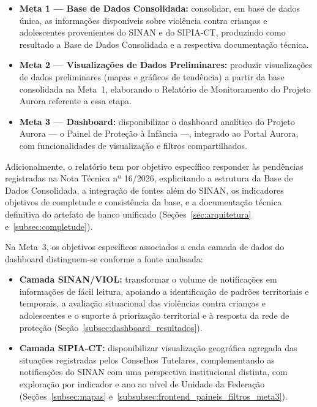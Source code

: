 \documentclass[11pt,a4paper]{article}
\begin{document}
\begin{itemize}
  \item \textbf{Meta 1 — Base de Dados Consolidada:} consolidar, em base de dados única, as informações disponíveis sobre violência contra crianças e adolescentes provenientes do SINAN e do SIPIA-CT, produzindo como resultado a Base de Dados Consolidada e a respectiva documentação técnica.
  \item \textbf{Meta 2 — Visualizações de Dados Preliminares:} produzir visualizações de dados preliminares (mapas e gráficos de tendência) a partir da base consolidada na Meta~1, elaborando o Relatório de Monitoramento do Projeto Aurora referente a essa etapa.
  \item \textbf{Meta 3 — Dashboard:} disponibilizar o dashboard analítico do Projeto Aurora — o Painel de Proteção à Infância —, integrado ao Portal Aurora, com funcionalidades de visualização e filtros compartilhados.
\end{itemize}

Adicionalmente, o relatório tem por objetivo específico responder às pendências registradas na Nota Técnica nº 16/2026, explicitando a estrutura da Base de Dados Consolidada, a integração de fontes além do SINAN, os indicadores objetivos de completude e consistência da base, e a documentação técnica definitiva do artefato de banco unificado (Seções~\ref{sec:arquitetura} e~\ref{subsec:completude}).

Na Meta~3, os objetivos específicos associados a cada camada de dados do dashboard distinguem-se conforme a fonte analisada:

\begin{itemize}
  \item \textbf{Camada SINAN/VIOL:} transformar o volume de notificações em informações de fácil leitura, apoiando a identificação de padrões territoriais e temporais, a avaliação situacional das violências contra crianças e adolescentes e o suporte à priorização territorial e à resposta da rede de proteção (Seção~\ref{subsec:dashboard_resultados}).
  \item \textbf{Camada SIPIA-CT:} disponibilizar visualização geográfica agregada das situações registradas pelos Conselhos Tutelares, complementando as notificações do SINAN com uma perspectiva institucional distinta, com exploração por indicador e ano ao nível de Unidade da Federação (Seções~\ref{subsec:mapas} e~\ref{subsubsec:frontend_paineis_filtros_meta3}).
\end{itemize}

\clearpage
\end{document}
